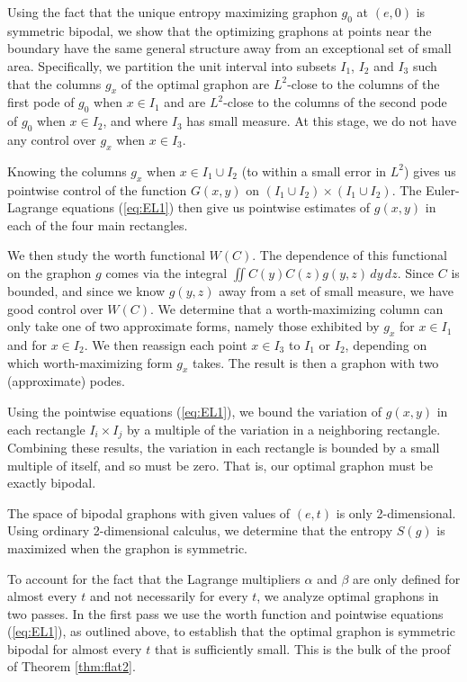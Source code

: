 \documentclass[12pt]{amsart}
\newcommand{\Value}{worth}
\begin{document}
{Using the fact that the unique entropy maximizing graphon $g_0$
at $(e,0)$ is symmetric bipodal, we show that the 
optimizing graphons at points near the boundary have the same general structure
away from an exceptional set of small area. Specifically, we partition the unit interval 
into subsets $I_1$, $I_2$ and $I_3$ such that the columns $g_x$ of 
the optimal graphon are $L^2$-close to the columns of the
first pode of $g_0$ when $x \in I_1$ and are $L^2$-close to the columns 
of the second pode of $g_0$ when $x \in I_2$, and where $I_3$ has 
small measure. At this stage, we do not have any control over $g_x$
when $x \in I_3$. 

Knowing the columns $g_x$ when $x \in I_1 \cup I_2$ 
(to within a small error in $L^2$) gives us pointwise control of the function 
$G(x,y)$ on $(I_1 \cup I_2) \times (I_1 \cup I_2)$. The
Euler-Lagrange equations (\ref{eq:EL1}) then give us pointwise estimates of 
$g(x,y)$ in each of the four main rectangles. 

We then study the \Value{} functional $W(C)$. The dependence of this functional on the graphon $g$ comes via
the integral $\iint C(y) C(z) g(y,z) \, dy \, dz$. Since $C$ is bounded,
and since we know $g(y,z)$ away from a set of small measure, we have 
good control over $W(C)$. 
We determine that a \Value-maximizing column can only take one of two approximate forms, namely those 
exhibited by $g_x$ for $x \in I_1$ and for $x \in I_2$. We then reassign each point $x \in I_3$ to $I_1$ 
or $I_2$, depending on which \Value-maximizing form $g_x$ takes. 
The result is then a graphon with two (approximate) podes. 

Using the pointwise equations (\ref{eq:EL1}), we bound the variation of $g(x,y)$ in each rectangle $I_i \times I_j$ 
by a multiple of the
variation in a neighboring rectangle. Combining these results, the variation in each 
rectangle is bounded by a small multiple of itself, and so must 
be zero. That is, our optimal
graphon must be exactly bipodal. 


The space of bipodal graphons with given values of $(e,t)$ is only 2-dimensional. Using ordinary 2-dimensional
calculus, we determine that the entropy $S(g)$ is maximized when the graphon is symmetric. 

To account for the fact that the Lagrange multipliers $\alpha$ and $\beta$ are only defined 
for almost every $t$ and not necessarily for every $t$, we analyze optimal graphons in two passes. In the first 
pass we use the \Value{} function and pointwise equations (\ref{eq:EL1}), as outlined above, to establish that the optimal graphon is symmetric bipodal for almost every 
$t$ that is sufficiently small. This is the bulk of the proof of Theorem \ref{thm:flat2}. 

}
\end{document}
